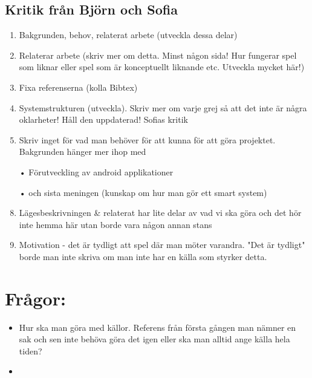 \documentclass[a4paper,11pt]{article}
\begin{document}
\subsection{Kritik från Björn och Sofia}
\begin{enumerate}
\item Bakgrunden, behov, relaterat arbete (utveckla dessa delar)
\item Relaterar arbete (skriv mer om detta. Minst någon sida! Hur fungerar spel som liknar eller spel som är konceptuellt liknande etc. Utveckla mycket här!)
\item Fixa referenserna (kolla Bibtex)
\item Systemstrukturen (utveckla). Skriv mer om varje grej så att det inte är några oklarheter! Håll den uppdaterad!
\newline
Sofias kritik
\item Skriv inget för vad man behöver för att kunna för att göra projektet. Bakgrunden hänger mer ihop med 
\item[•] Förutveckling av android applikationer
\item[•] och sista meningen (kunskap om hur man gör ett smart system)

\item Lägesbeskrivningen \& relaterat har lite delar av vad vi ska göra och det hör inte hemma här utan borde vara någon annan stans
\item Motivation - det är tydligt att spel där man möter varandra. "Det är tydligt" borde man inte skriva om man inte har en källa som styrker detta.
\end{enumerate}

\section{Frågor:}
\begin{itemize}
\item Hur ska man göra med källor. Referens från första gången man nämner en sak och sen inte behöva göra det igen eller ska man alltid ange källa hela tiden?
\item 
\end{itemize}
\end{document}
